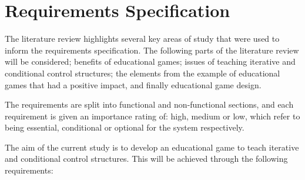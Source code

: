 \documentclass[a4paper,11.5pt]{report}
\numberwithin{figure}{section}
\numberwithin{table}{section}
\numberwithin{equation}{section}
\numberwithin{equation}{section}
\newcommand\blankpage{%
    \null
    \thispagestyle{empty}%
    \addtocounter{page}{-1}%
    \newpage}
\begin{document}

\afterpage{\blankpage}





\chapter{Requirements Specification}


The literature review highlights several key areas of study that were used to inform the requirements specification. The following parts of the literature review will be considered; benefits of educational games; issues of teaching iterative and conditional control structures; the elements from the example of educational games that had a positive impact, and finally educational game design.

The requirements are split into functional and non-functional sections, and each requirement is given an importance rating of: high, medium or low, which refer to being essential, conditional or optional for the system respectively. 

The aim of the current study is to develop an educational game to teach iterative and conditional control structures. This will be achieved through the following requirements:
\end{document}
